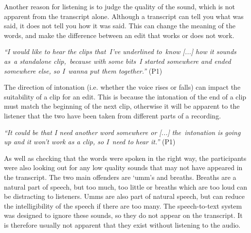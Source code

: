 
Another reason for listening is to judge the quality of the sound, which is not apparent from the transcript
alone. Although a transcript can tell you what was said, it does not tell you how it was said. This can change the
meaning of the words, and make the difference between an edit that works or does not work.

\textit{``I would like to hear the clips that I've underlined to know [...] how it sounds as a standalone clip, because
with some bits I started somewhere and ended somewhere else, so I wanna put them together.''} (P1)


The direction of intonation (i.e. whether the voice rises or falls) can impact the suitability of a clip for an
edit. This is because the intonation of the end of a clip must match the beginning of the next clip, otherwise it will
be apparent to the listener that the two have been taken from different parts of a recording.

\textit{``It could be that I need another word somewhere or [...] the intonation is going up and it won't work as a
clip, so I need to hear it.''} (P1)

As well as checking that the words were spoken in the right way, the participants were also looking out for any low
quality sounds that may not have appeared in the transcript. The two main offenders are `umm's and breaths.  Breaths
are a natural part of speech, but too much, too little or breaths which are too loud can be distracting to listeners.
Umms are also part of natural speech, but can reduce the intelligibility of the speech if there are too many.  The
speech-to-text system was designed to ignore these sounds, so they do not appear on the transcript.  It is therefore
usually not apparent that they exist without listening to the audio.


